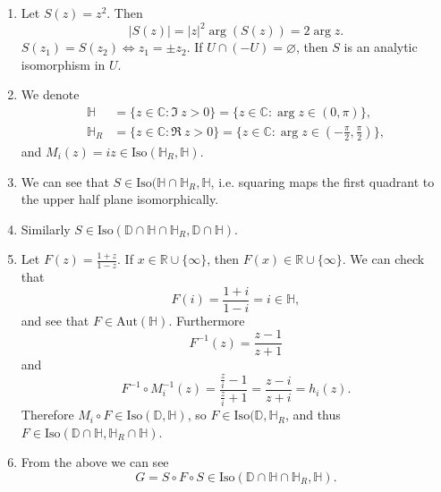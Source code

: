 \begin{xmpl}
  \begin{enumerate}
    \item{
      Let $S(z) = z^2$. Then
      $$
        |S(z)|
      = |z|^2 \arg(S(z))
      = 2 \arg z.
      $$
      $S(z_1) = S(z_2) \iff  z_1 = \pm z_2$.
      If $U \cap (-U) = \varnothing$, then $S$ is an analytic
      isomorphism in $U$.
    }
    \item{
      We denote
      \begin{align*}
         \mathbb{H}
      &= \{ z \in \mathbb{C} : \Im~z > 0 \}
       = \{ z \in \mathbb{C} : \arg z \in (0, \pi) \}, \\
         \mathbb{H}_R
      &= \{ z \in \mathbb{C} : \Re~z > 0 \}
       = \{ z \in \mathbb{C}
          : \arg z \in \left(-\frac{\pi}{2}, \frac{\pi}{2}\right)
         \},
      \end{align*}
      and $M_i(z) = i z \in \mathrm{Iso}(\mathbb{H}_R, \mathbb{H})$.
    }
    \item{
      We can see that
      $S \in \mathrm{Iso}(\mathbb{H} \cap \mathbb{H}_R, \mathbb{H}$,
      i.e. squaring maps the first quadrant to the upper half plane
      isomorphically.
    }
    \item{
      Similarly
      $S \in \mathrm{Iso}(
               \mathbb{D} \cap \mathbb{H} \cap \mathbb{H}_R,
               \mathbb{D} \cap \mathbb{H})$.
    }
    \item{
      Let $F(z) = \frac{1 + z}{1 - z}$. If
      $x \in \mathbb{R} \cup \{ \infty \}$, then
      $F(x) \in \mathbb{R} \cup \{ \infty \}$.
      We can check that
      $$
        F(i)
      = \frac{1 + i}
             {1 - i}
      = i \in \mathbb{H},
      $$
      and see that $F \in \mathrm{Aut}(\mathbb{H})$.
      Furthermore
      $$
        F^{-1}(z)
      = \frac{z - 1}
             {z + 1}
      $$
      and
      $$
        F^{-1} \circ M_i^{-1}(z)
      = \frac{\frac{z}{i} - 1}
             {\frac{z}{i} + 1}
      = \frac{z - i}
             {z + i}
      = h_i(z).
      $$
      Therefore
      $M_i \circ F \in \mathrm{Iso}(\mathbb{D}, \mathbb{H})$,
      so $F \in \mathrm{Iso}(\mathbb{D}, \mathbb{H}_R$, and thus
      $F \in \mathrm{Iso}(\mathbb{D} \cap \mathbb{H},
                          \mathbb{H}_R \cap \mathbb{H})$.
    }
    \item{
      From the above we can see
      $$
          G
      =   S \circ F \circ S
      \in \mathrm{Iso}(\mathbb{D} \cap \mathbb{H} \cap \mathbb{H}_R,
                       \mathbb{H}).
      $$
}
\end{enumerate}
\end{xmpl}
